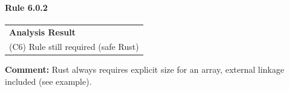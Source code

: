 \paragraph{Rule 6.0.2}
\begin{longtable}{p{13cm}}
\textbf{Analysis Result} \\
(C6) Rule still required (safe Rust) \\
\end{longtable}
\textbf{Comment:} Rust always requires explicit size for an array, external linkage included (see example). \\


